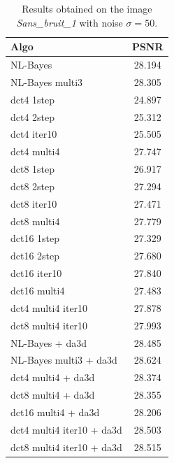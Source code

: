 \documentclass{ipol}
\begin{document}
\begin{table}%
\caption{Results obtained on the image \emph{Sans\_bruit\_1} with noise $\sigma =50$. }
\begin{center}
\begin{tabular}{l|c}
\bf Algo & \bf PSNR \\
\hline
NL-Bayes & 28.194\\
NL-Bayes multi3& 28.305\\

\hline
\hline

dct4 1step& 24.897 \\ 
dct4 2step& 25.312 \\
dct4 iter10& 25.505 \\
dct4 multi4 &  27.747\\

\hline
dct8 1step& 26.917 \\ 
dct8 2step& 27.294 \\
dct8 iter10& 27.471 \\
dct8 multi4 &  27.779\\

\hline
dct16 1step& 27.329 \\
dct16 2step& 27.680 \\
dct16 iter10& 27.840 \\
dct16 multi4 &  27.483\\

\hline
\hline
dct4 multi4 iter10& 27.878 \\
dct8 multi4 iter10& 27.993 \\

\hline
\hline
NL-Bayes + da3d & 28.485\\
NL-Bayes multi3 + da3d & 28.624\\
dct4 multi4 + da3d &  28.374\\
dct8 multi4 + da3d &  28.355\\
dct16 multi4 + da3d &  28.206\\
dct4 multi4 iter10 + da3d& 28.503 \\
dct8 multi4 iter10 + da3d& 28.515 \\
\end{tabular}
\end{center}
\label{tab:compare}
\end{table}%
\end{document}
